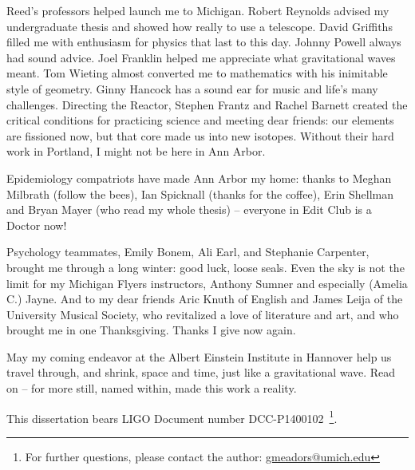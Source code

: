 \documentclass[leqno,twoside]{report}
\theoremstyle{plain}
\theoremstyle{definition}
\theoremstyle{remark}
\numberwithin{theorem}{chapter}        %
\begin{document}
Reed's professors helped launch me to Michigan.
Robert Reynolds advised my undergraduate thesis and showed how really to use a telescope.
David Griffiths filled me with enthusiasm for physics that last to this day.
Johnny Powell always had sound advice.
Joel Franklin helped me appreciate what gravitational waves meant.
Tom Wieting almost converted me to mathematics with his inimitable style of geometry.
Ginny Hancock has a sound ear for music and life's many challenges.
Directing the Reactor, Stephen Frantz and Rachel Barnett created the critical conditions for practicing science and meeting dear friends: our elements are fissioned now, but that core made us into new isotopes.
Without their hard work in Portland, I might not be here in Ann Arbor.

Epidemiology compatriots have made Ann Arbor my home: thanks to Meghan Milbrath (follow the bees), Ian Spicknall (thanks for the coffee), Erin Shellman and Bryan Mayer (who read my whole thesis) -- everyone in Edit Club is a Doctor now!

Psychology teammates, Emily Bonem, Ali Earl, and Stephanie Carpenter, brought me through a long winter: good luck, loose seals.
Even the sky is not the limit for my Michigan Flyers instructors, Anthony Sumner and especially (Amelia C.) Jayne.
And to my dear friends Aric Knuth of English and James Leija of the University Musical Society, who revitalized a love of literature and art, and who brought me in one Thanksgiving.
Thanks I give now again.

May my coming endeavor at the Albert Einstein Institute in Hannover help us travel through, and shrink, space and time, just like a gravitational wave.
Read on -- for more still, named within, made this work a reality.

This dissertation bears LIGO Document number DCC-P1400102~\footnote{For further questions, please contact the author: \href{mailto:gmeadors@umich.edu}{gmeadors@umich.edu}}.



\tableofcontents
\listoffigures
\listoftables
\listofappendices


\startthechapters 

\end{document}
